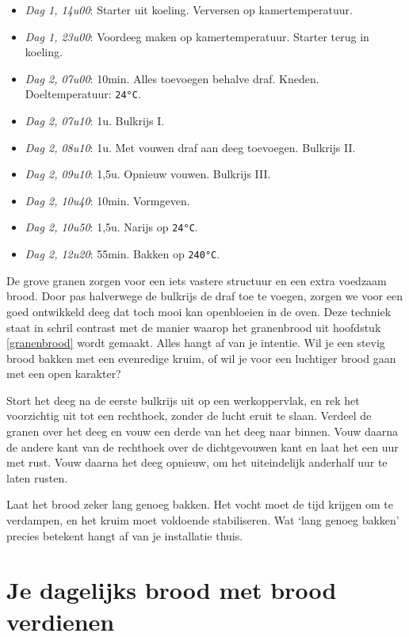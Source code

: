 \documentclass[
  11pt,
  dutch,
]{memoir}
\providecommand{\tightlist}{%
  \setlength{\itemsep}{0pt}\setlength{\parskip}{0pt}}
\begin{document}
\begin{itemize}
\tightlist
\item
  \emph{Dag 1, 14u00}: Starter uit koeling. Verversen op
  kamertemperatuur.
\item
  \emph{Dag 1, 23u00}: Voordeeg maken op kamertemperatuur. Starter terug
  in koeling.
\item
  \emph{Dag 2, 07u00}: 10min. Alles toevoegen behalve draf. Kneden.
  Doeltemperatuur: \texttt{24°C}.
\item
  \emph{Dag 2, 07u10}: 1u. Bulkrijs I.
\item
  \emph{Dag 2, 08u10}: 1u. Met vouwen draf aan deeg toevoegen. Bulkrijs
  II.
\item
  \emph{Dag 2, 09u10}: 1,5u. Opnieuw vouwen. Bulkrijs III.
\item
  \emph{Dag 2, 10u40}: 10min. Vormgeven.
\item
  \emph{Dag 2, 10u50}: 1,5u. Narijs op \texttt{24°C}.
\item
  \emph{Dag 2, 12u20}: 55min. Bakken op \texttt{240°C}.
\end{itemize}

De grove granen zorgen voor een iets vastere structuur en een extra
voedzaam brood. Door pas halverwege de bulkrijs de draf toe te voegen,
zorgen we voor een goed ontwikkeld deeg dat toch mooi kan openbloeien in
de oven. Deze techniek staat in schril contrast met de manier waarop het
granenbrood uit hoofdstuk \ref{granenbrood} wordt gemaakt. Alles hangt
af van je intentie. Wil je een stevig brood bakken met een evenredige
kruim, of wil je voor een luchtiger brood gaan met een open karakter?

Stort het deeg na de eerste bulkrijs uit op een werkoppervlak, en rek
het voorzichtig uit tot een rechthoek, zonder de lucht eruit te slaan.
Verdeel de granen over het deeg en vouw een derde van het deeg naar
binnen. Vouw daarna de andere kant van de rechthoek over de
dichtgevouwen kant en laat het een uur met rust. Vouw daarna het deeg
opnieuw, om het uiteindelijk anderhalf uur te laten rusten.

Laat het brood zeker lang genoeg bakken. Het vocht moet de tijd krijgen
om te verdampen, en het kruim moet voldoende stabiliseren. Wat `lang
genoeg bakken' precies betekent hangt af van je installatie thuis.

\hypertarget{je-dagelijks-brood-met-brood-verdienen}{%
\chapter{Je dagelijks brood met brood
verdienen}\label{je-dagelijks-brood-met-brood-verdienen}}
\end{document}
